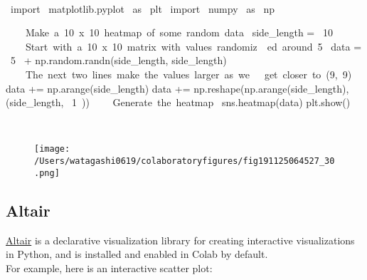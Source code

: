 \begin{paracol}{2}
\smallskip
\begin{cellExecute}[escapechar=~]
~~
\end{cellExecute}
\switchcolumn
\begin{codeCell}[escapechar=~]
~\textcolor{mtk17}{import}~ matplotlib.pyplot ~\textcolor{mtk17}{as}~ plt
~\textcolor{mtk17}{import}~ numpy ~\textcolor{mtk17}{as}~ np

~~~\textcolor{mtk8}{ Make a 10 x 10 heatmap of some random data}~
side_length = ~\textcolor{mtk7}{10}~
~~~\textcolor{mtk8}{ Start with a 10 x 10 matrix with values randomiz}~~\textcolor{mtk8}{ed around 5}~
data = ~\textcolor{mtk7}{5}~ + np.random.randn(side_length, side_length)
~~~\textcolor{mtk8}{ The next two lines make the values larger as we }~~\textcolor{mtk8}{get closer to (9, 9)}~
data += np.arange(side_length)
data += np.reshape(np.arange(side_length), (side_length, ~\textcolor{mtk7}{1}~))
~~~\textcolor{mtk8}{ Generate the heatmap}~
sns.heatmap(data)
plt.show()
\end{codeCell}
\end{paracol}

\begin{paracol}{2}
\begin{cellExecute}[escapechar=~]
~~
\end{cellExecute}
\switchcolumn
\begin{resultCell}[escapechar=~]
\end{resultCell}
\end{paracol}

\begin{figure}[H]
\centering
\texttt{[image: /Users/watagashi0619/colaboratoryfigures/fig191125064527\_30.png]}
\end{figure}
\subsection{Altair}
\href{http://altair-viz.github.io}{Altair} is a declarative visualization library for creating interactive visualizations in Python, and is installed and enabled in Colab by default.\\
For example, here is an interactive scatter plot:\\

